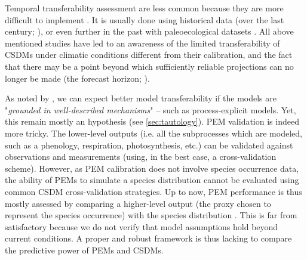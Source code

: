Temporal transferability assessment are less common because they are more difficult to implement \citep{Yates2018}. It is usually done using historical data (over the last century; \citealp{Wogan2016, Rapacciuolo2012}), or even further in the past with paleoecological datasets \citep{MorenoAmat2015, Varela2009, Maguire2016, Veloz2012, Williams2013}. 
All above mentioned studies have led to an awareness of the limited transferability of CSDMs under climatic conditions different from their calibration, and the fact that there may be a point beyond which sufficiently reliable projections can no longer be made (the forecast horizon; \citealp{Petchey2015}).

As noted by \citet{Yates2018}, we can expect better model transferability if the models are "\emph{grounded in well-described mechanisms}" -- such as process-explicit models. Yet, this remain mostly an hypothesis (see \autoref{sec:tautology}). 
PEM validation is indeed more tricky. 
The lower-level outputs (i.e. all the subprocesses which are modeled, such as a phenology, respiration, photosynthesis, etc.) can be validated against observations and measurements (using, in the best case, a cross-validation scheme). However, as PEM calibration does not involve species occurrence data, the ability of PEMs to simulate a species distribution cannot be evaluated using common CSDM cross-validation strategies. Up to now, PEM performance is thus mostly assessed by comparing a higher-level output (the proxy chosen to represent the species occurrence) with the species distribution \citep[e.g.][]{PetitCailleux2021}. This is far from satisfactory because we do not verify that model assumptions hold beyond current conditions. A proper and robust framework is thus lacking to compare the predictive power of PEMs and CSDMs. 

